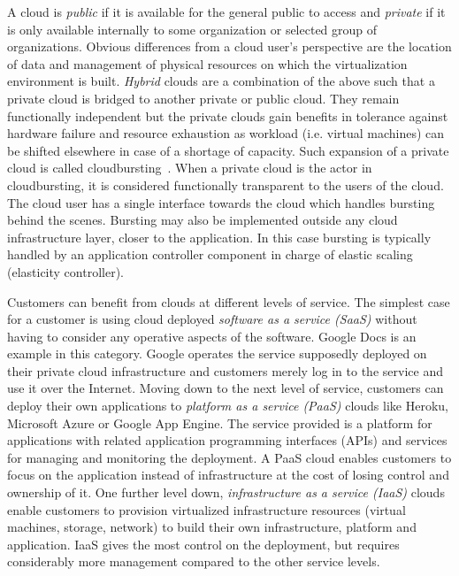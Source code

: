 \documentclass[english]{tktltiki2}
\theoremstyle{definition}
\theoremstyle{remark}
\begin{document}
A cloud is \emph{public} if it is available for the general public to access and
\emph{private} if it is only available internally to some organization or
selected group of organizations. Obvious differences from a cloud user’s
perspective are the location of data and management of physical resources on
which the virtualization environment is built. \emph{Hybrid} clouds are a
combination of the above such that a private cloud is bridged to another private
or public cloud. They remain functionally independent but the private clouds
gain benefits in tolerance against hardware failure and resource exhaustion as
workload (i.e. virtual machines) can be shifted elsewhere in case of a shortage
of capacity. Such expansion of a private cloud is called
cloudbursting~\cite{cloudbursting}. When a private cloud is the actor in
cloudbursting, it is considered functionally transparent to the users of the
cloud. The cloud user has a single interface towards the cloud which handles
bursting behind the scenes. Bursting may also be implemented outside any cloud
infrastructure layer, closer to the application. In this case bursting is
typically handled by an application controller component in charge of elastic
scaling (elasticity controller).

Customers can benefit from clouds at different levels of service. The simplest
case for a customer is using cloud deployed \emph{software as a service (SaaS)}
without having to consider any operative aspects of the software. Google Docs is
an example in this category. Google operates the service supposedly deployed on
their private cloud infrastructure and customers merely log in to the service
and use it over the Internet. Moving down to the next level of service,
customers can deploy their own applications to \emph{platform as a service
(PaaS)} clouds like Heroku, Microsoft Azure or Google App Engine. The service
provided is a platform for applications with related application programming
interfaces (APIs) and services for managing and monitoring the deployment. A
PaaS cloud enables customers to focus on the application instead of
infrastructure at the cost of losing control and ownership of it. One further
level down, \emph{infrastructure as a service (IaaS)} clouds enable customers to
provision virtualized infrastructure resources (virtual machines, storage,
network) to build their own infrastructure, platform and application. IaaS gives
the most control on the deployment, but requires considerably more management
compared to the other service levels.
\end{document}
